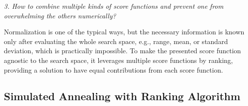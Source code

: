 \documentclass[sigconf]{acmart}
\begin{document}
    \textit{3. How to combine multiple kinds of score functions and prevent one from 
    overwhelming the others numerically?}
    
    Normalization is one of the typical ways, but the necessary information is known only 
    after evaluating the whole search space, e.g., range, mean, or standard deviation, 
    which is practically impossible. To make the presented score function 
    agnostic to the search space, it leverages multiple score functions by ranking, 
    providing a solution to have equal contributions from each score function. 

    \subsection{Simulated Annealing with Ranking Algorithm}
    
\end{document}
